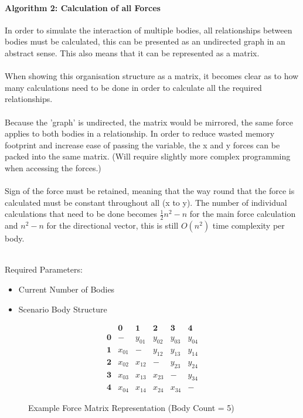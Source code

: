 \paragraph{Algorithm 2: Calculation of all Forces}
In order to simulate the interaction of multiple bodies, all relationships between bodies must be calculated, this can be presented as an undirected graph in an abstract sense. This also means that it can be represented as a matrix. 

\paragraph{}
When showing this organisation structure as a matrix, it becomes clear as to how many calculations need to be done in order to calculate all the required relationships.

\paragraph{}
Because the 'graph' is undirected, the matrix would be mirrored, the same force applies to both bodies in a relationship.
In order to reduce wasted memory footprint and increase ease of passing the variable, the x and y forces can be packed into the same matrix. (Will require slightly more complex programming when accessing the forces.)

\paragraph{}
Sign of the force must be retained, meaning that the way round that the force is calculated must be constant throughout all (x to y).
The number of individual calculations that need to be done becomes $\frac{1}{2}n^2-n$ for the main force calculation and $n^2-n$ for the directional vector, this is still $O(n^2)$ time complexity per body. \\\

Required Parameters:
\begin{itemize}
\item Current Number of Bodies
\item Scenario Body Structure
\end{itemize}

\begin{figure}[!ht]
  \centering
  $$\begin{array}{c|c|c|c|c|c}
  ~ & \textbf{0} & \textbf{1} & \textbf{2} & \textbf{3} & \textbf{4} \\ 
  \hline
  \textbf{0} & -      & y_{01} & y_{02} & y_{03} & y_{04} \\
  \hline
  \textbf{1} & x_{01} & -      & y_{12} & y_{13} & y_{14} \\
  \hline
  \textbf{2} & x_{02} & x_{12} & -      & y_{23} & y_{24} \\
  \hline
  \textbf{3} & x_{03} & x_{13} & x_{23} & -      & y_{34} \\
  \hline
  \textbf{4} & x_{04} & x_{14} & x_{24} & x_{34} & -
 \end{array}$$
  \caption{Example Force Matrix Representation (Body Count = 5)}
\end{figure}

